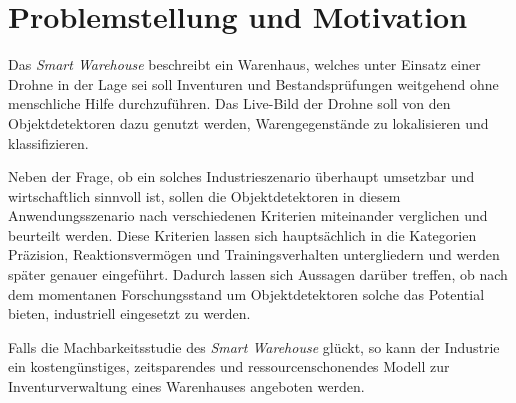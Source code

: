 \section{Problemstellung und Motivation}

Das \textit{Smart Warehouse} beschreibt ein Warenhaus, welches unter Einsatz einer Drohne in der Lage sei soll Inventuren und Bestandsprüfungen weitgehend ohne menschliche Hilfe durchzuführen. Das Live-Bild der Drohne soll von den Objektdetektoren dazu genutzt werden, Warengegenstände zu lokalisieren und klassifizieren. 

Neben der Frage, ob ein solches Industrieszenario überhaupt umsetzbar und wirtschaftlich sinnvoll ist, sollen die Objektdetektoren in diesem Anwendungsszenario nach verschiedenen Kriterien miteinander verglichen und beurteilt werden. Diese Kriterien lassen sich hauptsächlich in die Kategorien Präzision, Reaktionsvermögen und Trainingsverhalten untergliedern und werden später genauer eingeführt. Dadurch lassen sich Aussagen darüber treffen, ob nach dem momentanen Forschungsstand um Objektdetektoren solche das Potential bieten, industriell eingesetzt zu werden. 

Falls die Machbarkeitsstudie des \textit{Smart Warehouse} glückt, so kann der Industrie ein kostengünstiges, zeitsparendes und ressourcenschonendes Modell zur Inventurverwaltung eines Warenhauses angeboten werden.